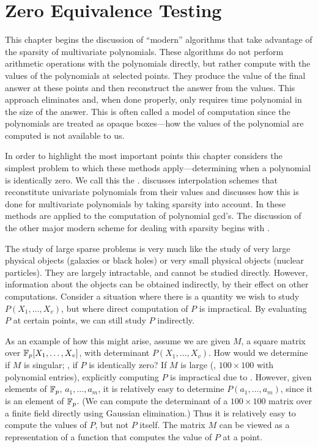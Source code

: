 \chapter{Zero Equivalence Testing}
\label{Zero:Testing:Chap}

This chapter begins the discussion of ``modern'' algorithms that take
advantage of the sparsity of multivariate polynomials.  These
algorithms do not perform arithmetic operations with the polynomials
directly, but rather compute with the values of the polynomials at
selected points.  They produce the value of the final answer at these
points and then reconstruct the answer from the values.  This approach
eliminates  and, when done
properly, only requires time polynomial in the size of the answer.
This is often called a  model of computation since the
polynomials are treated as opaque boxes---how the values of the
polynomial are computed is not available to us.

In order to highlight the most important points this chapter
considers the simplest problem to which these methods
apply---determining when a polynomial is identically zero.  We call
this the .
 discusses interpolation schemes that
reconstitute univariate polynomials from their values and
 discusses how this is done for
multivariate polynomials by taking sparsity into account.  In
 these methods are applied to the computation
of polynomial {\sc gcd}'s.  The discussion of the other major modern
scheme for dealing with sparsity begins with .

The study of large sparse problems is very much like the study of very
large physical objects (galaxies or black holes) or very small
physical objects (nuclear particles).  They are largely intractable,
and cannot be studied directly.  However, information about the
objects can be obtained indirectly, by their effect on other
computations.  Consider a situation where there is a quantity we wish
to study $P(X_1, \ldots, X_v)$, but where direct computation of $P$
is impractical.  By evaluating $P$ at certain points, we can still
study $P$ indirectly.

As an example of how this might arise, assume we are given $M$, a
square matrix over $\mathbb{F}_p[X_1, \ldots, X_v]$, with determinant $P(X_1,
\ldots, X_v)$.  How would we determine if $M$ is singular; \ie, if
$P$ is identically zero?  If $M$ is large (\eg, $100 \times 100$ with 
polynomial entries), explicitly computing $P$ is impractical due to
.  However, given elements of
$\mathbb{F}_p$, $a_1, \ldots, a_m$, it is relatively easy to determine $P(a_1,
\ldots, a_m)$, since it is an element of $\mathbb{F}_p$.  (We can compute the 
determinant of a $100\times 100$ matrix over a finite field directly using 
Gaussian elimination.)  Thus it is relatively easy to compute the values 
of $P$, but not $P$ itself.  The matrix $M$ can be viewed as a 
representation of a function that computes the value of $P$ at a point.


